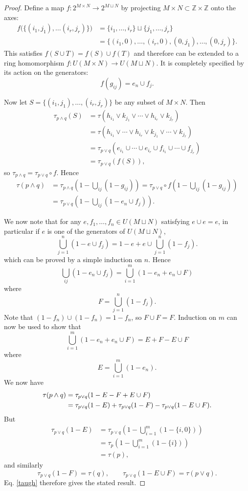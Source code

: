 \documentclass[12pt,reqno]{article}
\newcommand{\upline}{\vspace{-1.2\abovedisplayskip}}
\renewcommand{\(}{\left(}
\renewcommand{\)}{\right)}
\newcommand{\Z}{\mathbb{Z}}
\newcommand{\<}{\langle}
\renewcommand{\>}{\rangle}
\newcommand{\be}{\begin{equation}}
\newcommand{\ee}{\end{equation}}
\theoremstyle{plain} %
\begin{document}
\begin{proof}
Define a map $f:2^{M\times N} \to 2^{M\sqcup N}$ by projecting $M\times N \subset \Z\times\Z$ onto the axes: 
\begin{align*}
f\big(\{(i_1,j_1),\ldots (i_r,j_r)\}\big) &= \{i_1,\ldots,i_r\}\sqcup\{j_1,\ldots,j_r\}\\
&=\{(i_1,0),\ldots,(i_r,0),(0,j_1),\ldots,(0,j_r)\}.
\end{align*}
This satisfies $f(S\cup T) = f(S)\cup f(T)$ and therefore can be extended to a ring homomorphism $f:U(M\times N) \to U(M\sqcup N)$. It is completely specified by its action on the generators: 
\be\label{gen}
f(g_{ij}) = e_n\cup f_j.
\ee

Now let $S = \{(i_1,j_1),\ldots ,(i_r,j_r)\}$ be any subset of $M\times N$. Then
\begin{align*}
\tau_{p\land q}(S)
&= \tau\(h_{i_1}\lor k_{j_1}\lor\cdots\lor h_{i_r}\lor k_{j_r}\)\\
&= \tau\(h_{i_1}\lor\cdots\lor h_{i_r}\lor k_{j_1}\lor\cdots \lor k_{j_r}\)\\
&= \tau_{p\lor q}\(e_{i_1}\cup\cdots\cup e_{i_r}\cup f_{i_1}\cup\cdots\cup f_{j_r}\)\\
&= \tau_{p\lor q}(f(S)),
\end{align*}
so $\tau_{p\land q} = \tau_{p\lor q}\circ f$. Hence
\begin{align*}
\tau(p\land q) &= \tau_{p\land q}\(1 - \bigcup_{ij}(1 - g_{ij})\)
= \tau_{p\lor q}\circ f\(1 - \bigcup_{ij}(1 - g_{ij})\)\\
&= \tau_{p\lor q}\(1 - \bigcup_{ij}\(1 - e_n\cup f_j\)\).
\end{align*}

We now note that for any $e, f_1,\ldots,f_n\in U(M\sqcup N)$ satisfying $e\cup e = e$, in particular if $e$ is one of the generators of $U(M\sqcup N)$,
\[
\bigcup_{j=1}^n (1 - e\cup f_j) = 1 - e + e\cup\bigcup_{j=1}^n(1 - f_j).
\]
which can be proved by a simple induction on $n$. Hence
\[
\bigcup_{ij}(1 - e_n\cup f_j) = \bigcup_{i=1}^m(1 - e_n + e_n\cup F)
\]
where
\upline
\[
F = \bigcup_{j=1}^n(1 - f_j).
\]
Note that $(1 - f_n)\cup(1 - f_n) = 1 - f_n$, so $F\cup F = F$. Induction on $m$ can now be used to show that 
\[
\bigcup_{i=1}^m(1 - e_n + e_n\cup F) = E + F - E\cup F
\]
where
\upline
\[
E = \bigcup_{i=1}^m (1- e_n).
\]
We now have
\begin{align}\label{taugh}
\tau(p\land q) &= \tau_{p\lor q} (1 - E - F + E\cup F)\notag\\
&= \tau_{p\lor q}(1 - E) + \tau_{p\lor q}(1 - F) - \tau_{p\lor q}(1 - E\cup F).
\end{align}
But
\upline
\begin{align*}
\tau_{p\lor q}(1 - E) &= \tau_{p\lor q}\(1 - \bigcup_{i=1}^m(1 - \{i,0\})\)\\
&= \tau_p\( 1 - \bigcup_{i=1}^m(1 - \{i\})\)\\
&= \tau(p),
\end{align*}
and similarly
\[
\tau_{p\lor q}(1 - F) = \tau(q), \qquad \tau_{p\lor q}(1 - E\cup F) = \tau(p\lor q).
\]
Eq. \eqref{taugh} therefore gives the stated result.
\end{proof}
\end{document}
